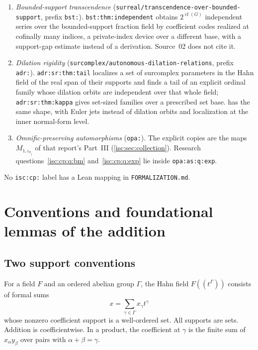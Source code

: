 \documentclass[11pt,letterpaper]{article}
\theoremstyle{definition}
\theoremstyle{remark}
\newcommand{\cf}{\operatorname{cf}}
\newcommand{\rpath}[1]{\nolinkurl{#1}}%
\newcommand{\lbl}[1]{\nolinkurl{#1}}%
\numberwithin{equation}{section}
\begin{document}
\begin{enumerate}[leftmargin=*,itemsep=3pt]
and the mechanism (the tail-span theorem \lbl{tail:thm:tail} for
multiquadratic coefficients) differ from those of
\cref{isc:cp:thm:lacunary,isc:cp:thm:generic}, whose base is a compositum
or a finite-generation envelope and whose tool is coefficient degree or a
coefficient derivation. Source~02 does not cite it; the two are related,
not duplicates.
\item \emph{Bounded-support transcendence}
(\rpath{surreal/transcendence-over-bounded-support}, prefix \texttt{bst:}).
\lbl{bst:thm:independent} obtains $2^{\cf(G)}$ independent series over the
bounded-support fraction field by coefficient codes realized at cofinally
many indices, a private-index device over a different base, with a
support-gap estimate instead of a derivation. Source~02 does not cite it.
\item \emph{Dilation rigidity}
(\rpath{surcomplex/autonomous-dilation-relations}, prefix \texttt{adr:}).
\lbl{adr:sr:thm:tail} localizes a set of surcomplex parameters in the Hahn
field of the real span of their supports and finds a tail of an explicit
ordinal family whose dilation orbits are independent over that whole field;
\lbl{adr:sr:thm:kappa} gives set-sized families over a prescribed set base.
 has the same shape, with Euler jets instead of
dilation orbits and localization at the inner normal-form level.
\item \emph{Omnific-preserving automorphisms} (\texttt{opa:}). The
explicit copies are the maps $M_{1,\iota_{\sigma_j}}$ of that report's
Part~III (\cref{isc:sec:collection}). Research questions~\ref{isc:cp:q:bm}
and~\ref{isc:cp:q:exp} lie inside \lbl{opa:as:q:exp}.
\end{enumerate}
No \texttt{isc:cp:} label has a Lean mapping in \rpath{FORMALIZATION.md}.

\section{Conventions and foundational lemmas of the addition}
\label{isc:cp:sec:foundations}

\subsection{Two support conventions}

For a field $F$ and an ordered abelian group $\Gamma$, the Hahn field
$F((t^\Gamma))$ consists of formal sums
\[
 x=\sum_{\gamma\in\Gamma}x_\gamma t^\gamma
\]
whose nonzero coefficient support is a well-ordered set. All supports are
sets. Addition is coefficientwise. In a product, the coefficient at
$\gamma$ is the finite sum of $x_\alpha y_\beta$ over pairs with
$\alpha+\beta=\gamma$.
\end{document}
